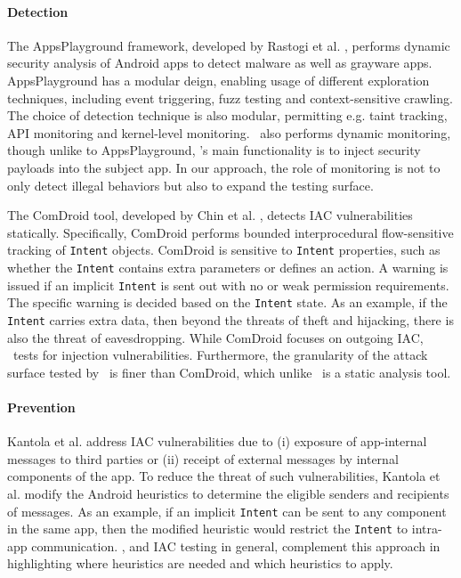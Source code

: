 \paragraph{Detection} The AppsPlayground framework, developed by Rastogi et al. \cite{RCE:CODAPSY13}, performs dynamic security analysis of Android apps to detect malware as well as grayware apps.  AppsPlayground has a modular deign, enabling usage of different exploration techniques, including event triggering, fuzz testing and context-sensitive crawling. The choice of detection technique is also modular, permitting e.g. taint tracking, API monitoring and kernel-level monitoring. 
%
\Tool\ also performs dynamic monitoring, though unlike to AppsPlayground, \Tool's main functionality is to inject security payloads into the subject app. In our approach, the role of monitoring is not to only detect illegal behaviors but also to expand the testing surface.


The ComDroid tool, developed by Chin et al. \cite{CFGW:MOBISYS11}, detects IAC vulnerabilities statically. Specifically, ComDroid performs bounded interprocedural flow-sensitive tracking of {\tt Intent} objects. ComDroid is sensitive to {\tt Intent} properties, such as whether the {\tt Intent} contains extra parameters or defines an action. A warning is issued if an implicit {\tt Intent} is sent out with no or weak permission requirements. The specific warning is decided based on the {\tt Intent} state. As an example, if the {\tt Intent} carries extra data, then beyond the threats of theft and hijacking, there is also the threat of eavesdropping. 
%
While ComDroid focuses on outgoing IAC, \Tool\ tests for injection vulnerabilities. Furthermore, the granularity of the attack surface tested by \Tool\ is finer than ComDroid, which unlike \Tool\ is a static analysis tool.

\paragraph{Prevention} %
Kantola et al. \cite{KCHW:SPSM12} address IAC vulnerabilities due to (i) exposure of app-internal messages to third parties or (ii) receipt of external messages by internal components of the app. To reduce the threat of such vulnerabilities, Kantola et al. modify the Android heuristics to determine the eligible senders and recipients of messages. As an example, if an implicit {\tt Intent} can be sent to any component in the same app, then the modified heuristic would restrict the {\tt Intent} to intra-app communication.
%
\Tool, and IAC testing in general, complement this approach in highlighting where heuristics are needed and which heuristics to apply.

